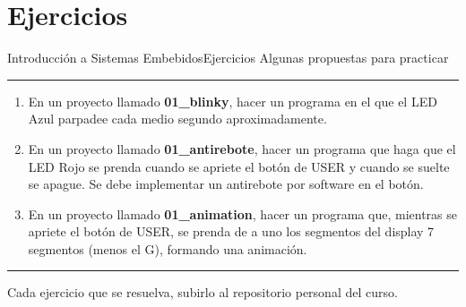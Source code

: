 \documentclass[aspectratio=169, xcolor=dvipsnames]{beamer}
\begin{document}
\section{Ejercicios}
\begin{frame}{Introducción a Sistemas Embebidos}{Ejercicios}
    Algunas propuestas para practicar
    \noindent\rule{\textwidth}{0.75pt}
    \begin{enumerate}
        \item En un proyecto llamado \textbf{01\_blinky}, hacer un programa en el que el LED Azul parpadee cada medio segundo aproximadamente.
        \item En un proyecto llamado \textbf{01\_antirebote}, hacer un programa que haga que el LED Rojo se prenda cuando se apriete el botón de USER y cuando se suelte se apague. Se debe implementar un antirebote por software en el botón.
        \item En un proyecto llamado \textbf{01\_animation}, hacer un programa que, mientras se apriete el botón de USER, se prenda de a uno los segmentos del display 7 segmentos (menos el G), formando una animación.
    \end{enumerate}
    \noindent\rule{\textwidth}{0.75pt}
    Cada ejercicio que se resuelva, subirlo al repositorio personal del curso.
\end{frame}
\end{document}
